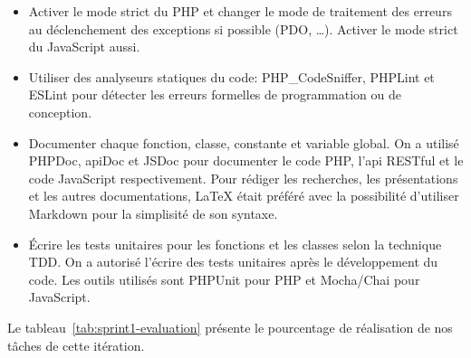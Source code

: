 \begin{itemize}
    \item Activer le mode strict du PHP et changer le mode de traitement des
        erreurs au déclenchement des exceptions si possible (PDO, \ldots).
        Activer le mode strict du JavaScript aussi.
    \item Utiliser des analyseurs statiques du code: PHP\_CodeSniffer, PHPLint
        et ESLint pour détecter les erreurs formelles de programmation ou de
        conception.
    \item Documenter chaque fonction, classe, constante et variable global. On
        a utilisé PHPDoc, apiDoc et JSDoc pour documenter le code PHP, l'api
        RESTful et le code JavaScript respectivement. Pour rédiger les
        recherches, les présentations et les autres documentations, \LaTeX{}
        était préféré avec la possibilité d'utiliser Markdown pour la
        simplisité de son syntaxe.
    \item Écrire les tests unitaires pour les fonctions et les classes selon la
        technique \acrshort{TDD}. On a autorisé l'écrire des tests unitaires
        après le développement du code. Les outils utilisés sont PHPUnit pour
        PHP et Mocha/Chai pour JavaScript.
\end{itemize}

Le tableau~\ref{tab:sprint1-evaluation} présente le pourcentage de réalisation
de nos tâches de cette itération.

